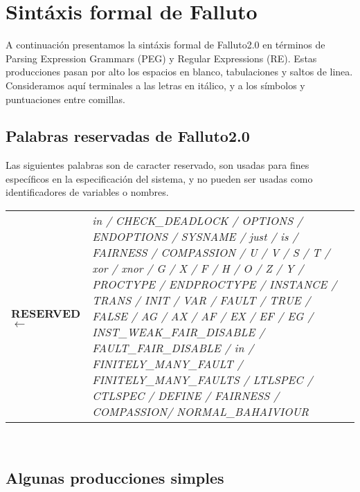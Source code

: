 \documentclass[titlepage, 12pt]{book}
\begin{document}


\chapter{Sint\'axis formal de Falluto}
\label{sintaxisFormal}

A continuaci\'on presentamos la sint\'axis formal de Falluto2.0 en t\'erminos de Parsing Expression Grammars (PEG) y Regular Expressions (RE). Estas producciones pasan por alto los espacios en blanco, tabulaciones y saltos de linea. Consideramos aqu\'i terminales a las letras en it\'alico, y a los s\'imbolos y puntuaciones entre comillas.

\section{Palabras reservadas de Falluto2.0}

Las siguientes palabras son de caracter reservado, son usadas para fines específicos en la especificación del sistema, y no pueden ser usadas como identificadores de variables o nombres.\\

\begin{tabularx}{\textwidth}{>{\bfseries}l>{\itshape}X }

RESERVED $\longleftarrow$ & in / CHECK\_DEADLOCK / OPTIONS / ENDOPTIONS / SYSNAME / just / is / FAIRNESS / COMPASSION / U / V / S / T / xor / xnor / G / X / F / H / O / Z / Y / PROCTYPE / ENDPROCTYPE / INSTANCE / TRANS / INIT / VAR / FAULT / TRUE / FALSE / AG / AX / AF / EX / EF / EG / INST\_WEAK\_FAIR\_DISABLE / FAULT\_FAIR\_DISABLE / in / FINITELY\_MANY\_FAULT / FINITELY\_MANY\_FAULTS / LTLSPEC / CTLSPEC / DEFINE / FAIRNESS / COMPASSION/ NORMAL\_BAHAIVIOUR\\
\end{tabularx}
~\\




\section{Algunas producciones simples}
\end{document}
